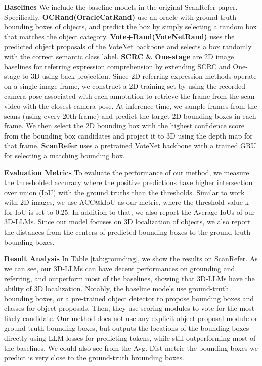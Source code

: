     \textbf{Baselines} We include the baseline models in the original ScanRefer paper. Specifically, \textbf{OCRand(OracleCatRand)} use an oracle with ground truth bounding boxes of objects, and predict the box
by simply selecting a random box that matches the object category. \textbf{Vote+Rand(VoteNetRand)} uses the predicted object proposals of the
VoteNet \cite{Qi2019DeepHV} backbone and selects a box randomly with the correct semantic class label. \textbf{SCRC \& One-stage} are 2D image baselines for referring expression comprehension by extending SCRC \cite{hu2016natural} and One-stage \cite{yang2019fast} to 3D using back-projection.
Since 2D referring expression methods operate on a single image frame, we construct a 2D training set by using the recorded camera pose associated with each
annotation to retrieve the frame from the scan video with the closest camera
pose. At inference time, we sample frames from the scans (using every 20th
frame) and predict the target 2D bounding boxes in each frame. We then select
the 2D bounding box with the highest confidence score from the bounding box
candidates and project it to 3D using the depth map for that frame. \textbf{ScanRefer} uses a pretrained VoteNet
backbone with a trained GRU for selecting a matching bounding box.

    \textbf{Evaluation Metrics} To evaluate the performance of our method, we measure the thresholded
accuracy where the positive predictions have higher intersection over union (IoU)
with the ground truths than the thresholds. Similar to work with 2D images, we
use ACC@kIoU as our metric, where the threshold value k for IoU is set to 0.25. In addition to that, we also report the Average IoUs of our 3D-LLMs. Since our model focuses on 3D localization of objects, we also report the distances from the centers of predicted bounding boxes to the ground-truth bounding boxes.
    
    \textbf{Result Analysis} In Table \ref{tab:grounding}, we show the results on ScanRefer. As we can see, our 3D-LLMs can have decent performances on grounding and referring, and outperform most of the baselines, showing that 3D-LLMs have the ability of 3D localization. 
    Notably, the baseline models use ground-truth bounding boxes, or a pre-trained object detector to propose bounding boxes and classes for object proposals. Then, they use scoring modules to vote for the most likely candidate. Our method does not use any explicit object proposal module or ground truth bounding boxes, but outputs the locations of the bounding boxes directly using LLM losses for predicting tokens, while still outperforming most of the baselines. We could also see from the Avg. Dist metric the bounding boxes we predict is very close to the ground-truth brounding boxes. 

